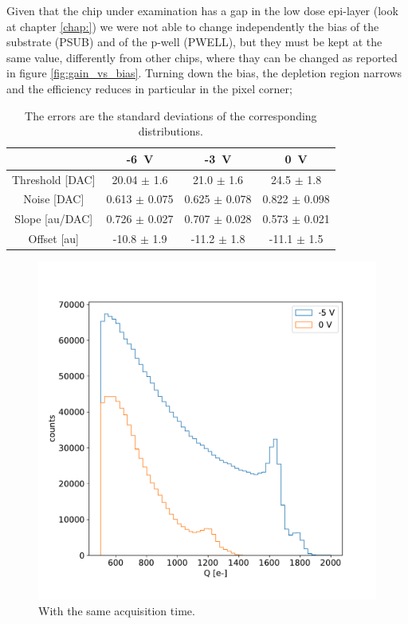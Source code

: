     Given that the chip under examination has a gap in the low dose epi-layer (look at chapter \ref{chap:}) we were not able to change independently the bias of the substrate (PSUB) and of the p-well (PWELL), but they must be kept at the same value, differently from other chips, where thay can be changed as reported in figure \ref{fig:gain_vs_bias}.
    Turning down the bias, the depletion region narrows and the efficiency reduces in particular in the pixel corner; 

    \begin{table}
            \begin{center}
            \begin{tabular}{| c |  c | c | c |}
            \hline
               & -\SI{6}{V} & -\SI{3}{V} & \SI{0}{V}\\
            \hline
            \hline
            Threshold [DAC] & 20.04 $\pm$ 1.6 & 21.0 $\pm$ 1.6 & 24.5 $\pm$ 1.8\\
            Noise [DAC] & 0.613 $\pm$ 0.075 & 0.625 $\pm$ 0.078 & 0.822 $\pm$ 0.098\\
            Slope [au/DAC] & 0.726 $\pm$ 0.027 & 0.707 $\pm$ 0.028  & 0.573 $\pm$ 0.021\\
            Offset [au] & -10.8 $\pm$ 1.9 & -11.2 $\pm$ 1.8 & -11.1 $\pm$ 1.5 \\
            \hline
            \end{tabular}
            \caption{The errors are the standard deviations of the corresponding distributions.}
            \label{tab:parameters_vs_bias}
            \end{center}
        \end{table}  

        
        \begin{figure}[h!]
            \centering
            \includegraphics[width=.60\linewidth]{figures/charaterization/Fe_spectrum_bias.pdf}
            \caption{With the same acquisition time. }
            \label{fig:Fe_spectrum_bias}
        \end{figure}            
   
